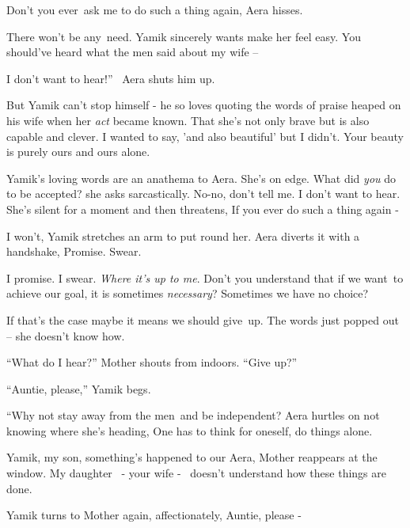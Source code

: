 \documentclass[letterpaper]{article}
\begin{document}
{\textquotedbl}Don't you ever~ask me to do such a thing again,{\textquotedbl} Aera hisses. 

{\textquotedbl}There won't be any~need.{\textquotedbl} Yamik sincerely wants make her feel easy. {\textquotedbl}You
should've heard what the men said about my wife --{\textquotedbl} 

{\textquotedbl}I don't want to hear!'' \ Aera shuts him up. 

But Yamik can't stop himself - he so loves quoting the words of praise heaped on his wife when her \textit{act} became
known. {\textquotedbl}That she's not only brave but is also capable and clever. I wanted to say, 'and also beautiful'
but I didn't. Your beauty is purely ours and ours alone.{\textquotedbl} ~

Yamik's loving words are an anathema to Aera. She's on edge. {\textquotedbl}What did \textit{you} do to be
accepted?{\textquotedbl} she asks sarcastically. {\textquotedbl}No-no, don't tell me. I don't want to
hear.{\textquotedbl} She's silent for a moment and then threatens, {\textquotedbl}If you ever do such a thing again
-{\textquotedbl}

{\textquotedbl}I won't,{\textquotedbl} Yamik stretches an arm to put round her. Aera diverts it with a handshake,
{\textquotedbl}Promise. Swear.{\textquotedbl} 

{\textquotedbl}I promise. I swear. \textit{Where it's up to me}. Don't you understand that if we want~to achieve our
goal, it is sometimes \textit{necessary}? Sometimes we have no choice?{\textquotedbl} 

{\textquotedbl}If that's the case maybe it means we should give~up.{\textquotedbl} The words just popped out -- she
doesn't know how.

{}``What do I hear?'' Mother shouts from indoors. ``Give up?'' 

{}``Auntie, please,'' Yamik begs.

{}``Why not stay away from the men~and be independent?{\textquotedbl} Aera hurtles on not knowing where she's heading,
{\textquotedbl}One has to think for oneself, do things alone.{\textquotedbl}

{\textquotedbl}Yamik, my son, something's happened to our Aera,{\textquotedbl} Mother reappears at the window.
{\textquotedbl}My daughter \ {}- your wife - \ doesn't understand how these things are done.{\textquotedbl} 

Yamik turns to Mother again, affectionately, {\textquotedbl}Auntie, please -{\textquotedbl}
\end{document}
